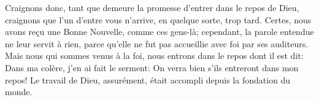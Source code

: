 Craignons donc, tant que demeure la promesse d’entrer dans le repos de Dieu,
	craignons que l’un d’entre vous n’arrive, en quelque sorte, trop tard.
Certes, nous avons reçu une Bonne Nouvelle, comme ces gens-là;
	cependant, la parole entendue ne leur servit à rien,
	parce qu’elle ne fut pas accueillie avec foi par ses auditeurs.
Mais nous qui sommes venus à la foi, nous entrons dans le repos dont il est dit:
	Dans ma colère, j’en ai fait le serment:
	On verra bien s’ils entreront dans mon repos!
Le travail de Dieu, assurément, était accompli depuis la fondation du monde.
